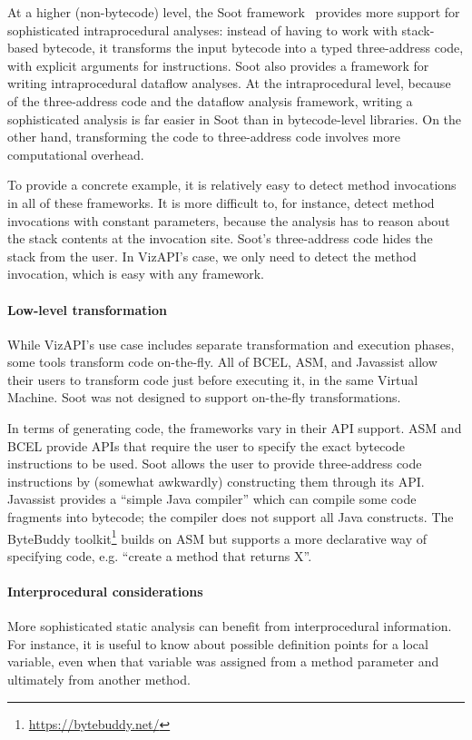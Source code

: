 At a higher (non-bytecode) level, the Soot
framework~\cite{lam11:_soot_java} provides more support for
sophisticated intraprocedural analyses: instead of having to work with
stack-based bytecode, it transforms the input bytecode into a typed
three-address code, with explicit arguments for instructions. Soot
also provides a framework for writing intraprocedural dataflow
analyses.  At the intraprocedural level, because of the three-address
code and the dataflow analysis framework, writing a sophisticated
analysis is far easier in Soot than in bytecode-level libraries. On
the other hand, transforming the code to three-address code involves
more computational overhead.

To provide a concrete example, it is relatively easy to detect method
invocations in all of these frameworks. It is more difficult to, for
instance, detect method invocations with constant parameters, because
the analysis has to reason about the stack contents at the invocation
site. Soot's three-address code hides the stack from the user. In VizAPI's
case, we only need to detect the method invocation, which is easy
with any framework.

\paragraph{Low-level transformation}
While VizAPI's use case includes separate transformation and execution
phases, some tools transform code on-the-fly. All of BCEL, ASM,
and Javassist allow their users to transform code just before executing it,
in the same Virtual Machine. Soot was not designed to support on-the-fly
transformations.

In terms of generating code, the frameworks vary in their API support.
ASM and BCEL provide APIs that require the user to specify the exact
bytecode instructions to be used. Soot allows the user to provide
three-address code instructions by (somewhat awkwardly) constructing
them through its API. Javassist provides a ``simple Java compiler''
which can compile some code fragments into bytecode; the compiler does
not support all Java constructs.  The ByteBuddy
toolkit\footnote{\url{https://bytebuddy.net/}} builds on ASM but
supports a more declarative way of specifying code, e.g. ``create a
method that returns X''.

\paragraph{Interprocedural considerations}
More sophisticated static analysis can benefit from interprocedural
information. For instance, it is useful to know about possible
definition points for a local variable, even when that variable
was assigned from a method parameter and ultimately from another method.

